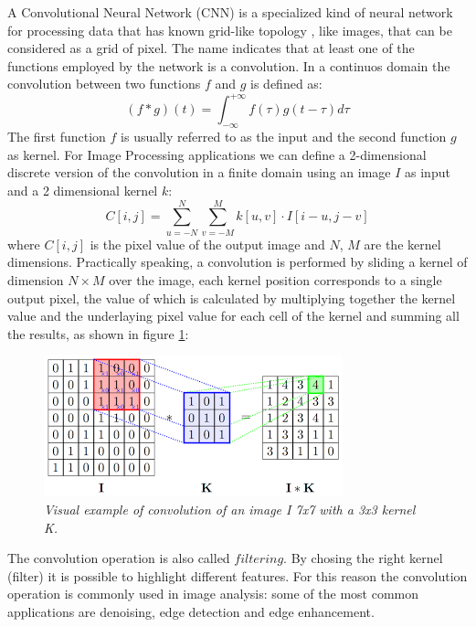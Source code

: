 \documentclass[12pt,a4paper]{report}
\begin{document}
A Convolutional Neural Network (CNN) is a specialized kind of neural network for processing data that has known grid-like topology \cite{Goodfellow-et-al-2016}, like images, that can be considered as a grid of pixel.
The name indicates that at least one of the functions employed by the network is a convolution. In a continuos domain the convolution between two functions $f$ and $g$ is defined as: 
\begin{equation}
 (f * g)(t) = \int_{-\infty}^{+\infty} f(\tau)g(t-\tau)d\tau
\end{equation}
The first function $f$ is usually referred to as the input and the second function $g$ as kernel. 
For Image Processing applications we can define a 2-dimensional discrete version of the convolution in a finite domain using an image $I$ as input and a 2 dimensional kernel $k$:
\begin{equation}
 C[i, j] = \sum_{u=-N}^N \sum_{v=-M}^M k[u, v] \cdot I[i-u, j-v]
 \label{eq:conv}
\end{equation}
where $C[i, j]$ is the pixel value of the output image and $N$, $M$ are the kernel dimensions.
Practically speaking, a convolution is performed by sliding a kernel of dimension $N \times M$ over the image, each kernel position corresponds to a single output pixel, the value of which is calculated by multiplying together the kernel value and the underlaying pixel value for each cell of the kernel and summing all the results, as shown in figure \ref{fig:convolution}:

\begin{figure}[h]
 \centering
 \includegraphics[scale=1.]{./images/conv.png}
 \caption{\it Visual example of convolution of an image I 7x7 with a 3x3 kernel K.}
 \label{fig:convolution}
\end{figure}

The convolution operation is also called $filtering$. By chosing the right kernel (filter) it is possible to highlight different features. For this reason the convolution operation is commonly used in image analysis: some of the most common applications are denoising, edge detection and edge enhancement. 
\end{document}
